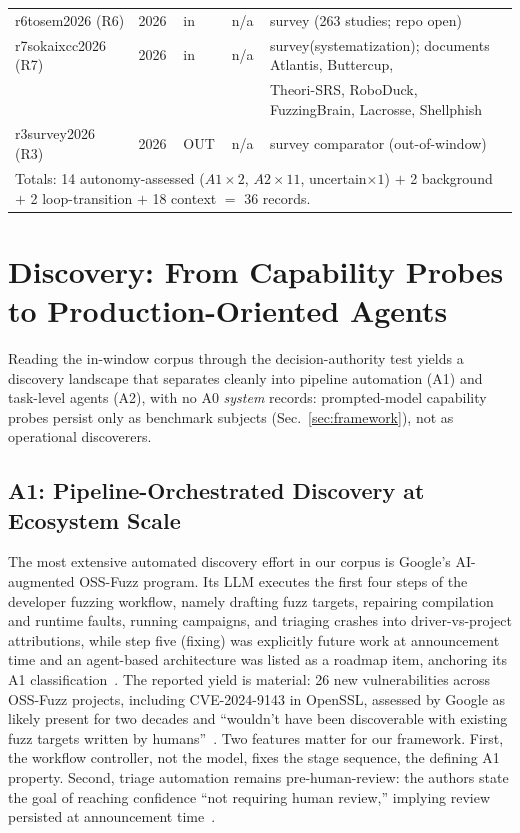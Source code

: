 \documentclass[conference,compsoc]{IEEEtran}
\begin{document}
\begin{table}[t]
{\begin{tabular}{lllll}
r6tosem2026 (R6)        & 2026 & in & n/a & survey (263 studies; repo open) \\
r7sokaixcc2026 (R7)      & 2026 & in & n/a & survey(systematization); documents Atlantis, Buttercup,\\
                         &      &    &     & Theori-SRS, RoboDuck, FuzzingBrain, Lacrosse, Shellphish \\
r3survey2026 (R3) & 2026 & OUT& n/a & survey comparator (out-of-window) \\
\bottomrule
\multicolumn{5}{l}{\scriptsize Totals: 14 autonomy-assessed ($A1{\times}2$, $A2{\times}11$, uncertain${\times}1$)
$+$ 2 background $+$ 2 loop-transition $+$ 18 context $=$ 36 records.}\\
\end{tabular}
}
\end{table}


\vspace{6pt}
\section{Discovery: From Capability Probes to Production-Oriented Agents}
\label{sec:discovery}
Reading the in-window corpus through the decision-authority test yields a discovery landscape
that separates cleanly into pipeline automation (A1) and task-level agents (A2), with no A0
\emph{system} records: prompted-model capability probes persist only as benchmark subjects
(Sec.~\ref{sec:framework}), not as operational discoverers.

\subsection{A1: Pipeline-Orchestrated Discovery at Ecosystem Scale}
The most extensive automated discovery effort in our corpus is Google's AI-augmented
OSS-Fuzz program. Its LLM executes the first four steps of the developer fuzzing workflow, namely 
drafting fuzz targets, repairing compilation and runtime faults, running campaigns, and
triaging crashes into driver-vs-project attributions, while step five (fixing) was
explicitly future work at announcement time and an agent-based architecture was listed as a
roadmap item, anchoring its A1 classification~\cite{ossfuzz-levelingup-2024}. The reported yield is
material: 26 new vulnerabilities across OSS-Fuzz projects, including CVE-2024-9143 in OpenSSL,
assessed by Google as likely present for two decades and ``wouldn't have been discoverable with
existing fuzz targets written by humans''~\cite{ossfuzz-levelingup-2024}. Two features matter for our
framework. First, the workflow controller, not the model, fixes the stage sequence, the
defining A1 property. Second, triage automation remains pre-human-review: the authors state the
goal of reaching confidence ``not requiring human review,'' implying review persisted at
announcement time~\cite{ossfuzz-levelingup-2024}.
\end{document}

